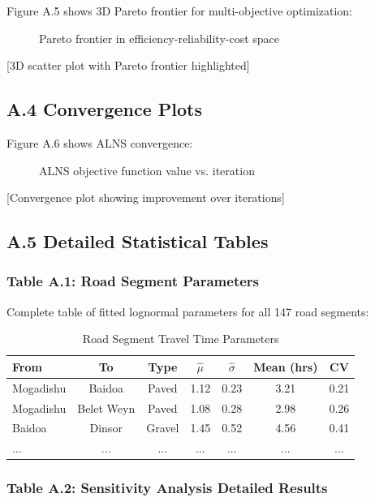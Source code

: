 Figure A.5 shows 3D Pareto frontier for multi-objective optimization:

\begin{figure}[H]
\centering
\caption{Pareto frontier in efficiency-reliability-cost space}
\end{figure}

[3D scatter plot with Pareto frontier highlighted]

\subsection{A.4 Convergence Plots}

Figure A.6 shows ALNS convergence:

\begin{figure}[H]
\centering
\caption{ALNS objective function value vs. iteration}
\end{figure}

[Convergence plot showing improvement over iterations]

\subsection{A.5 Detailed Statistical Tables}

\subsubsection{Table A.1: Road Segment Parameters}

Complete table of fitted lognormal parameters for all 147 road segments:

\begin{table}[H]
\centering
\small
\caption{Road Segment Travel Time Parameters}
\begin{tabular}{lcccccc}
\toprule
From & To & Type & $\hat{\mu}$ & $\hat{\sigma}$ & Mean (hrs) & CV \\
\midrule
Mogadishu & Baidoa & Paved & 1.12 & 0.23 & 3.21 & 0.21 \\
Mogadishu & Belet Weyn & Paved & 1.08 & 0.28 & 2.98 & 0.26 \\
Baidoa & Dinsor & Gravel & 1.45 & 0.52 & 4.56 & 0.41 \\
... & ... & ... & ... & ... & ... & ... \\
\bottomrule
\end{tabular}
\end{table}

\subsubsection{Table A.2: Sensitivity Analysis Detailed Results}

